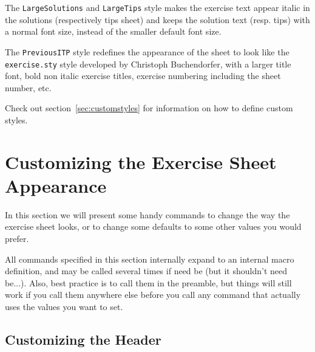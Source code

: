 \documentclass[11pt,a4paper]{article}
\begin{document}
The \texttt{LargeSolutions} and \texttt{LargeTips} style makes the exercise text appear
italic in the solutions (respectively tips sheet) and keeps the solution text (resp. tips)
with a normal font size, instead of the smaller default font size.

The \texttt{PreviousITP} style redefines the appearance of the sheet to look like the
\texttt{exercise.sty} style developed by Christoph Buchendorfer, with a larger title font,
bold non italic exercise titles, exercise numbering including the sheet number, etc.

Check out section~\ref{sec:customstyles} for information on how to define custom styles.

\section{Customizing the Exercise Sheet Appearance}
\label{sec:CustomizeSheet}

In this section we will present some handy commands to change the way the exercise sheet
looks, or to change some defaults to some other values you would prefer.

All  commands specified in this section internally expand to
an internal macro definition, and may be called several times if need be (but it shouldn't
need be...). Also, best practice is to call them in the preamble, but things will still
work if you call them anywhere else before you call any command that actually uses the
values you want to set.

\subsection{Customizing the Header}
\label{sec:CustomHeader}


\end{document}
